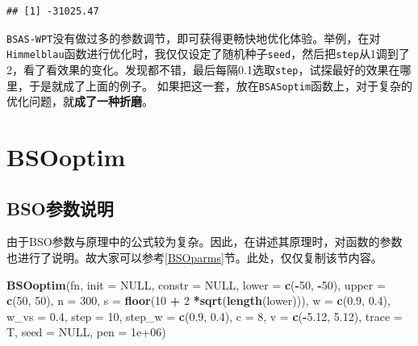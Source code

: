 \documentclass[]{ctexbook}
\newenvironment{Shaded}{\begin{snugshade}}{\end{snugshade}}
\newcommand{\KeywordTok}[1]{\textcolor[rgb]{0.13,0.29,0.53}{\textbf{#1}}}
\newcommand{\DataTypeTok}[1]{\textcolor[rgb]{0.13,0.29,0.53}{#1}}
\newcommand{\DecValTok}[1]{\textcolor[rgb]{0.00,0.00,0.81}{#1}}
\newcommand{\FloatTok}[1]{\textcolor[rgb]{0.00,0.00,0.81}{#1}}
\newcommand{\StringTok}[1]{\textcolor[rgb]{0.31,0.60,0.02}{#1}}
\newcommand{\OtherTok}[1]{\textcolor[rgb]{0.56,0.35,0.01}{#1}}
\newcommand{\OperatorTok}[1]{\textcolor[rgb]{0.81,0.36,0.00}{\textbf{#1}}}
\newcommand{\NormalTok}[1]{#1}
\begin{document}
\begin{verbatim}
## [1] -31025.47
\end{verbatim}

\texttt{BSAS-WPT}没有做过多的参数调节，即可获得更畅快地优化体验。举例，在对\texttt{Himmelblau}函数进行优化时，我仅仅设定了随机种子\texttt{seed}，然后把\texttt{step}从1调到了2，看了看效果的变化。发现都不错，最后每隔0.1选取\texttt{step}，试探最好的效果在哪里，于是就成了上面的例子。
如果把这一套，放在\texttt{BSASoptim}函数上，对于复杂的优化问题，就\textbf{成了一种折磨}。

\section{BSOoptim}\label{bsooptim}

\subsection{BSO参数说明}\label{BSOfuncparms}

由于BSO参数与原理中的公式较为复杂。因此，在讲述其原理时，对函数的参数也进行了说明。故大家可以参考\ref{BSOparms}节。此处，仅仅复制该节内容。

\begin{Shaded}
\begin{Highlighting}[]
\KeywordTok{BSOoptim}\NormalTok{(fn, }\DataTypeTok{init =} \OtherTok{NULL}\NormalTok{, }\DataTypeTok{constr =} \OtherTok{NULL}\NormalTok{, }
         \DataTypeTok{lower =} \KeywordTok{c}\NormalTok{(}\OperatorTok{-}\DecValTok{50}\NormalTok{, }\OperatorTok{-}\DecValTok{50}\NormalTok{), }\DataTypeTok{upper =} \KeywordTok{c}\NormalTok{(}\DecValTok{50}\NormalTok{, }\DecValTok{50}\NormalTok{), }\DataTypeTok{n =} \DecValTok{300}\NormalTok{, }
         \DataTypeTok{s =} \KeywordTok{floor}\NormalTok{(}\DecValTok{10} \OperatorTok{+}\StringTok{ }\DecValTok{2} \OperatorTok{*}\KeywordTok{sqrt}\NormalTok{(}\KeywordTok{length}\NormalTok{(lower))), }
         \DataTypeTok{w =} \KeywordTok{c}\NormalTok{(}\FloatTok{0.9}\NormalTok{, }\FloatTok{0.4}\NormalTok{), }
         \DataTypeTok{w_vs =} \FloatTok{0.4}\NormalTok{, }
         \DataTypeTok{step =} \DecValTok{10}\NormalTok{,}
         \DataTypeTok{step_w =} \KeywordTok{c}\NormalTok{(}\FloatTok{0.9}\NormalTok{, }\FloatTok{0.4}\NormalTok{), }
         \DataTypeTok{c =} \DecValTok{8}\NormalTok{, }
         \DataTypeTok{v =} \KeywordTok{c}\NormalTok{(}\OperatorTok{-}\FloatTok{5.12}\NormalTok{, }\FloatTok{5.12}\NormalTok{), }
         \DataTypeTok{trace =}\NormalTok{ T,}
         \DataTypeTok{seed =} \OtherTok{NULL}\NormalTok{, }
         \DataTypeTok{pen =} \FloatTok{1e+06}\NormalTok{)}
\end{Highlighting}
\end{Shaded}
\end{document}
